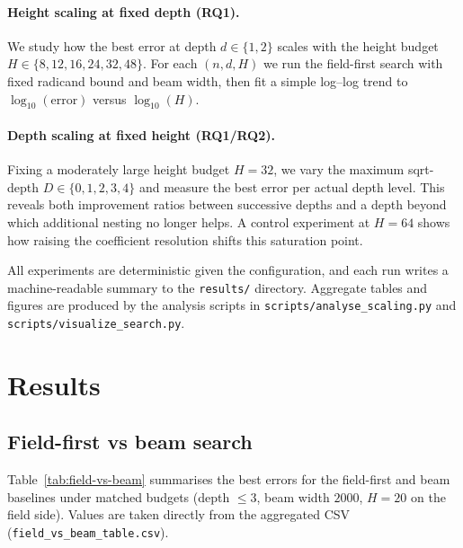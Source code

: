 \documentclass[11pt]{article}
\begin{document}
\paragraph{Height scaling at fixed depth (RQ1).}
We study how the best error at depth $d \in \{1,2\}$ scales with the height budget $H \in \{8,12,16,24,32,48\}$.
For each $(n,d,H)$ we run the field-first search with fixed radicand bound and beam width, then fit a simple log--log trend to $\log_{10}(\text{error})$ versus $\log_{10}(H)$.

\paragraph{Depth scaling at fixed height (RQ1/RQ2).}
Fixing a moderately large height budget $H=32$, we vary the maximum sqrt-depth $D \in \{0,1,2,3,4\}$ and measure the best error per actual depth level.
This reveals both improvement ratios between successive depths and a depth beyond which additional nesting no longer helps.
A control experiment at $H=64$ shows how raising the coefficient resolution shifts this saturation point.

All experiments are deterministic given the configuration, and each run writes a machine-readable summary to the \texttt{results/} directory.
Aggregate tables and figures are produced by the analysis scripts in \texttt{scripts/analyse\_scaling.py} and \texttt{scripts/visualize\_search.py}.

\section{Results}

\subsection{Field-first vs beam search}

Table~\ref{tab:field-vs-beam} summarises the best errors for the field-first and beam baselines under matched budgets (depth $\le 3$, beam width $2000$, $H=20$ on the field side).
Values are taken directly from the aggregated CSV (\texttt{field\_vs\_beam\_table.csv}).
\end{document}
